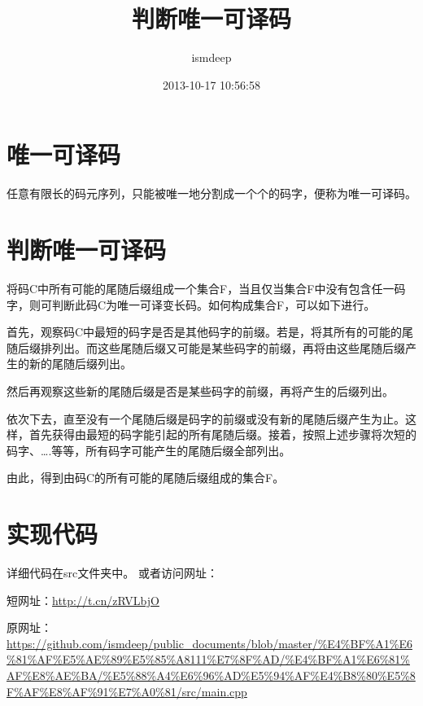 \documentclass[12pt,a4paper]{article}
\begin{document}
\begin{CJK}{UTF8}{gbsn}
\title{判断唯一可译码}
\author{ismdeep}
\date{2013-10-17 10:56:58}


\maketitle


\newpage
\section{唯一可译码}
任意有限长的码元序列，只能被唯一地分割成一个个的码字，便称为唯一可译码。

\section{判断唯一可译码}
    将码C中所有可能的尾随后缀组成一个集合F，当且仅当集合F中没有包含任一码字，则可判断此码C为唯一可译变长码。如何构成集合F，可以如下进行。

首先，观察码C中最短的码字是否是其他码字的前缀。若是，将其所有的可能的尾随后缀排列出。而这些尾随后缀又可能是某些码字的前缀，再将由这些尾随后缀产生的新的尾随后缀列出。

然后再观察这些新的尾随后缀是否是某些码字的前缀，再将产生的后缀列出。

依次下去，直至没有一个尾随后缀是码字的前缀或没有新的尾随后缀产生为止。这样，首先获得由最短的码字能引起的所有尾随后缀。接着，按照上述步骤将次短的码字、….等等，所有码字可能产生的尾随后缀全部列出。

由此，得到由码C的所有可能的尾随后缀组成的集合F。

\section{实现代码}
详细代码在src文件夹中。
或者访问网址：

短网址：\url{http://t.cn/zRVLbjO}

原网址：\url{https://github.com/ismdeep/public_documents/blob/master/%E4%BF%A1%E6%81%AF%E5%AE%89%E5%85%A8111%E7%8F%AD/%E4%BF%A1%E6%81%AF%E8%AE%BA/%E5%88%A4%E6%96%AD%E5%94%AF%E4%B8%80%E5%8F%AF%E8%AF%91%E7%A0%81/src/main.cpp}




\end{CJK}
\end{document}
